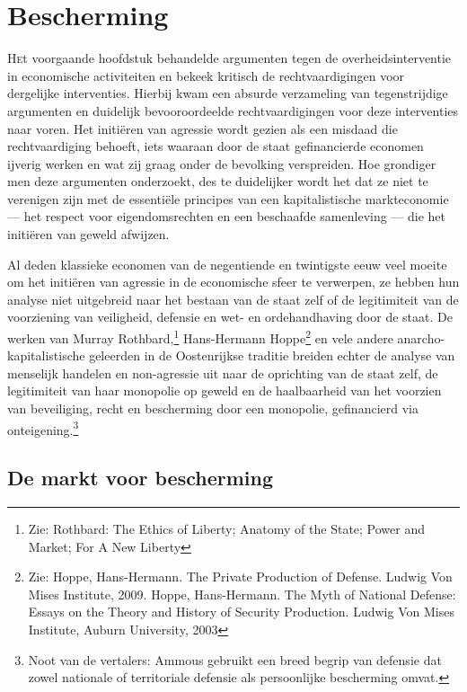 \hypertarget{bescherming}{%
\chapter{Bescherming}\label{bescherming}}

\lettrine[]{H}et voorgaande hoofdstuk behandelde argumenten tegen de overheidsinterventie in economische activiteiten en bekeek kritisch de rechtvaardigingen voor dergelijke interventies. Hierbij kwam een absurde verzameling van tegenstrijdige argumenten en duidelijk bevooroordeelde rechtvaardigingen voor deze interventies naar voren. Het initiëren van agressie wordt gezien als een misdaad die rechtvaardiging behoeft, iets waaraan door de staat gefinancierde economen ijverig werken en wat zij graag onder de bevolking verspreiden. Hoe grondiger men deze argumenten onderzoekt, des te duidelijker wordt het dat ze niet te verenigen zijn met de essentiële principes van een kapitalistische markteconomie — het respect voor eigendomsrechten en een beschaafde samenleving — die het initiëren van geweld afwijzen.

Al deden klassieke economen van de negentiende en twintigste eeuw veel moeite om het initiëren van agressie in de economische sfeer te verwerpen, ze hebben hun analyse niet uitgebreid naar het bestaan van de staat zelf of de legitimiteit van de voorziening van veiligheid, defensie en wet- en ordehandhaving door de staat. De werken van Murray Rothbard,\footnote{Zie: Rothbard: The Ethics of Liberty; Anatomy of the State; Power and Market; For A New Liberty} Hans-Hermann Hoppe\footnote{Zie: Hoppe, Hans-Hermann. The Private Production of Defense. Ludwig Von Mises Institute, 2009. Hoppe, Hans-Hermann. The Myth of National Defense: Essays on the Theory and History of Security Production. Ludwig Von Mises Institute, Auburn University, 2003} en vele andere anarcho-kapitalistische geleerden in de Oostenrijkse traditie breiden echter de analyse van menselijk handelen en non-agressie uit naar de oprichting van de staat zelf, de legitimiteit van haar monopolie op geweld en de haalbaarheid van het voorzien van beveiliging, recht en bescherming door een monopolie, gefinancierd via onteigening.\footnote{Noot van de vertalers: Ammous gebruikt een breed begrip van defensie dat zowel nationale of territoriale defensie als persoonlijke bescherming omvat.}

\hypertarget{de-markt-voor-bescherming}{%
\section{De markt voor bescherming}\label{de-markt-voor-bescherming}}


